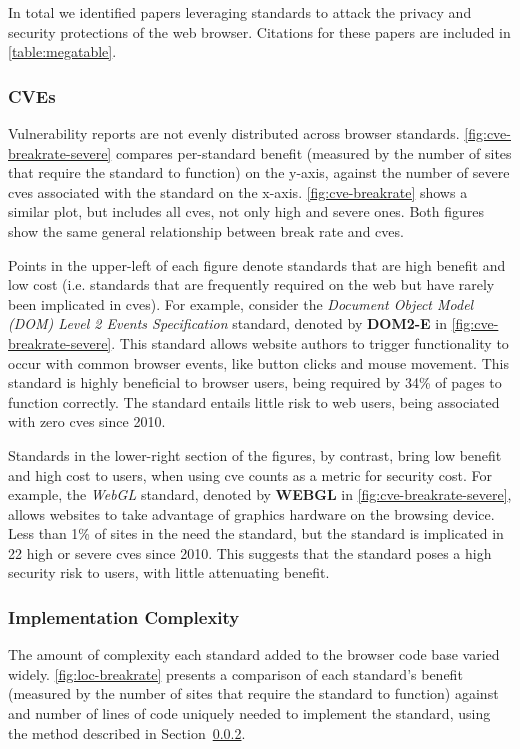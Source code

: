 In total we identified \NumAttackPapers papers leveraging \NumAttackStandards
standards to attack the privacy and security protections of the web browser.
Citations for these papers are included in \ref{table:megatable}.


\subsubsection{CVEs}
\label{cost-benefit:results:costs-cves}


Vulnerability reports are not evenly distributed across browser standards.
\ref{fig:cve-breakrate-severe} compares per-standard
benefit (measured by the number of sites that require the standard to function)
on the y-axis, against the number of severe \gls{cve}s associated with the
standard on the x-axis.  \ref{fig:cve-breakrate} shows a similar plot, but
includes all \gls{cve}s, not only high and severe ones.  Both figures
show the same general relationship between break rate and \gls{cve}s.

Points in the upper-left of each figure denote standards that are high benefit
and low cost  (i.e. standards that are frequently required on the web but have
rarely been implicated in \gls{cve}s).  For example, consider the
\textit{Document Object Model (DOM) Level 2 Events Specification} standard,
denoted by \textbf{DOM2-E} in \ref{fig:cve-breakrate-severe}.  This
standard allows website authors to trigger functionality to occur with
common browser events, like button clicks and mouse movement.  This standard is highly
beneficial to browser users, being required by 34\% of pages to function
correctly.  The standard entails little risk to web users, being
associated with zero \gls{cve}s since 2010.

Standards in the lower-right section of the figures, by contrast, bring
low benefit and high cost to users, when using \gls{cve} counts as a metric
for security cost.  For example, the \textit{WebGL} standard, denoted by
\textbf{WEBGL} in \ref{fig:cve-breakrate-severe}, allows websites to take
advantage of graphics hardware on the browsing device.
Less than 1\% of sites in the \ATK need the standard, but
the standard is implicated in 22 high or severe \gls{cve}s since 2010.  This
suggests that the standard poses a high security risk to users, with
little attenuating benefit.


\subsubsection{Implementation Complexity}
\label{cost-benefit:results:costs-loc}

The amount of complexity each standard added to the browser code base varied
widely. \ref{fig:loc-breakrate} presents a comparison of each standard's
benefit (measured by the number of sites that require the standard to function)
against and number of lines of code uniquely needed to implement the standard,
using the method described in Section~\ref{cost-benefit:results:costs-loc}.

